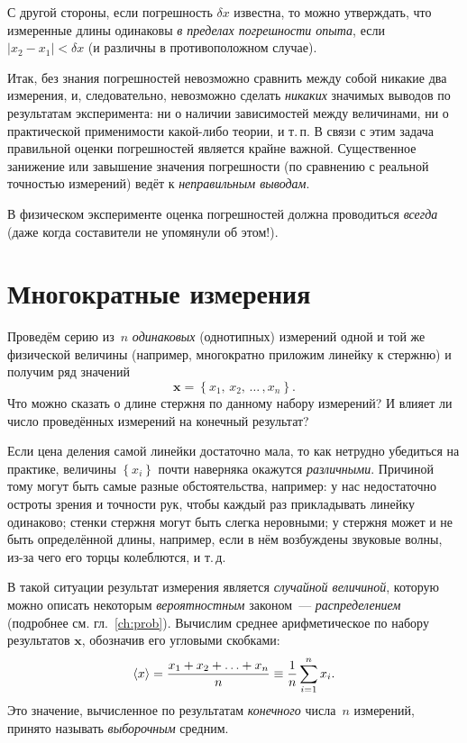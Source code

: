 С другой стороны, если погрешность $\delta x$ известна, то можно
утверждать, что измеренные длины одинаковы
\emph{в пределах погрешности опыта}, если $|x_{2}-x_{1}|<\delta x$
(и различны в противоположном случае).

Итак, без знания погрешностей невозможно сравнить между собой никакие
два измерения, и, следовательно, невозможно сделать \emph{никаких}
значимых выводов по результатам эксперимента: ни о наличии зависимостей
между величинами, ни о практической применимости какой-либо теории,
и т.\,п. В связи с этим задача правильной оценки погрешностей является крайне
важной. Существенное занижение или завышение значения погрешности
(по сравнению с реальной точностью измерений) ведёт к \emph{неправильным выводам}.

В физическом эксперименте оценка погрешностей должна проводиться \emph{всегда}
(даже когда составители  не упомянули об этом!).

\section{Многократные измерения}

Проведём серию из~$n$ \emph{одинаковых} (однотипных) измерений одной
и той же физической величины (например, многократно приложим линейку к стержню) и получим
ряд значений
\[
    \mathbf{x} = \left\{ x_{1},\,x_{2},\,\ldots\,,x_{n}\right\} .
\]
Что можно сказать о длине стержня по данному набору измерений?
И влияет ли число проведённых измерений на конечный результат?

Если цена деления самой линейки достаточно мала, то как нетрудно убедиться
на практике, величины $\left\{ x_{i}\right\}$ почти наверняка окажутся
\emph{различными}. Причиной тому могут быть
самые разные обстоятельства, например: у нас недостаточно остроты
зрения и точности рук, чтобы каждый раз прикладывать линейку одинаково;
стенки стержня могут быть слегка неровными; у стержня может и не быть
определённой длины, например, если в нём возбуждены звуковые волны,
из-за чего его торцы колеблются, и т.\,д.

В такой ситуации результат измерения является \emph{случайной величиной}, 
которую можно описать некоторым \emph{вероятностным} законом~---
\emph{распределением} (подробнее см. гл.~\ref{ch:prob}). 
Вычислим среднее арифметическое по набору результатов $\mathbf{x}$,
обозначив его угловыми скобками:
\begin{equation}
    \left<x\right> = \frac{x_{1}+x_{2}+\ldots+x_{n}}{n} \equiv 
    \frac{1}{n} \sum\limits_{i=1}^{n}x_{i}.
    \label{eq:average}
\end{equation}
Это значение, вычисленное по результатам \emph{конечного} числа~$n$ измерений,
принято называть \emph{выборочным} средним.


